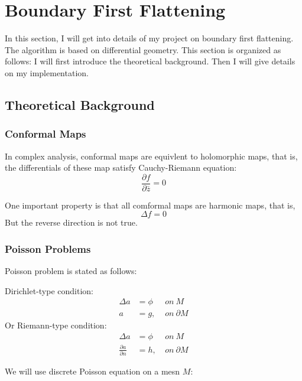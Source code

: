 \section{Boundary First Flattening}
In this section, I will get into details of my project on boundary first flattening. The algorithm is based on differential geometry. This section is organized as follows: I will first introduce the theoretical background. Then I will give details on my implementation.

\subsection{Theoretical Background}

\subsubsection{Conformal Maps}
In complex analysis,  conformal maps are equivlent to holomorphic maps, that is, the differentials of these map satisfy Cauchy-Riemann equation:
\begin{equation}
\frac{\partial f}{\partial \bar{z}} = 0
\end{equation}

One important property is that all comformal maps are harmonic maps, that is, 
\begin{equation}
\Delta f = 0
\end{equation}
But the reverse direction is not true.

\subsubsection{Poisson Problems}
Poisson problem is stated as follows:

Dirichlet-type condition:
\begin{equation}
\begin{split}
\Delta a &= \phi \ \ \ & on\  M\\
a &= g , & on\ \partial M
\end{split}
\end{equation}
Or Riemann-type condition:
\begin{equation}
\begin{split}
\Delta a &= \phi \ \ \ & on\  M\\
\frac{\partial a}{\partial n} &= h , & on\ \partial M 
\end{split}
\end{equation}

We will use discrete Poisson equation on a mesn $M$:

